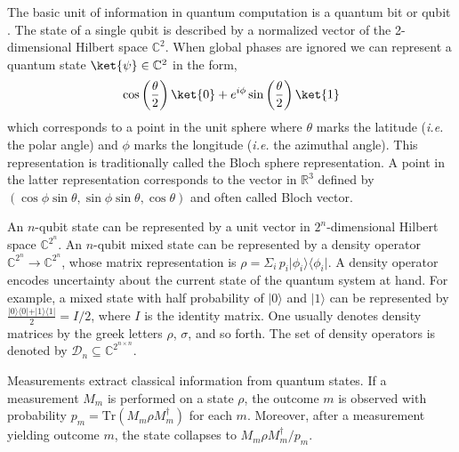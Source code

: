 The basic unit of information in quantum computation is a quantum bit or qubit \cite{perdrix2008quantum}. The state of a single qubit is described by a normalized vector of the 2-dimensional Hilbert space $\mathbb{C}^{2}$. When global phases are ignored we can represent a quantum state $\ket{\psi} \in \mathbb{C}^{2}$ in the form,
\begin{equation} \label{eq:qubit_bs}
     \cos\left(\frac{\theta}{2}\right) \ket{0} + e^{i\phi}\sin\left(\frac{\theta}{2}\right)\ket{1}
\end{equation}
which corresponds to a point in the unit sphere where $\theta$ marks the latitude (\textit{i.e.} the polar angle) and $\phi$ marks the longitude (\textit{i.e.} the azimuthal angle). This representation is traditionally called the Bloch sphere representation. A point in the latter representation
corresponds to the vector in $\mathbb{R}^{3}$ defined by $(\cos \phi \sin \theta, \sin \phi \sin \theta, \cos \theta)$ and often called Bloch vector.

An $n$-qubit state can be represented by a unit vector in $2^n$-dimensional Hilbert space $\mathbb{C}^{2^{n}}$. An $n$-qubit mixed state can be represented by a density operator $ \mathbb{C}^{2^{n}} \xrightarrow{} \mathbb{C}^{2^{n}}$, whose matrix representation is $\rho = \Sigma_{i} \hspace{2pt} p_{i} \vert \phi_{i} \rangle \langle \phi_{i} \vert$. A density operator encodes uncertainty about the current state of the quantum system at hand. For example, a mixed state with half probability of $\vert 0 \rangle$ and $\vert 1 \rangle$ can be represented by $\frac{\vert 0 \rangle \langle 0 \vert + \vert 1 \rangle \langle 1 \vert}{2}=I/2$, where $I$ is the identity matrix.  One usually denotes density matrices by the greek letters $\rho$, $\sigma$, and so forth. The set of density operators is denoted by $\mathcal{D}_{n} \subseteq \mathbb{C}^{ 2^{n \times n}}$.

Measurements extract classical information from quantum states.  If a measurement ${M_m}$ is performed on a state $\rho$, the outcome $m$ is observed with probability $p_m = \text{Tr}(M_{m} \rho M^{\dag}_{m})$ for each $m$. Moreover, after a measurement yielding outcome $m$, the state collapses to $M_{m}\rho M^{\dag}_{m}/p_{m}$. 



